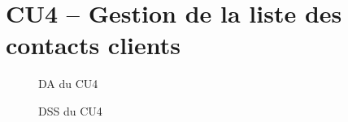 \section{CU4 – Gestion de la liste des contacts clients}

\begin{figure}[H]
\noindent{}
\caption{DA du CU4}
\end{figure}

\begin{figure}[H]
\noindent{}
\caption{DSS du CU4}
\end{figure}




